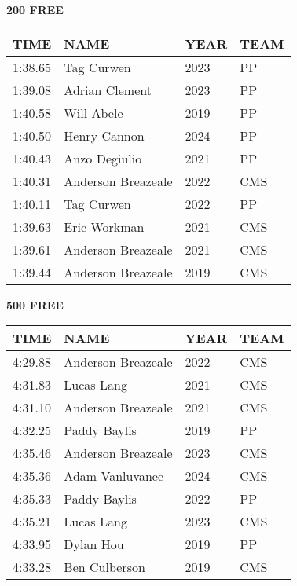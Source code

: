\begin{table}[H]
\centering
\begin{minipage}[t]{0.48\textwidth}
\centering
\textbf{200 FREE}\\[0.1cm]
\begin{tabular}{@{}p{1.8cm}p{2.8cm}p{1.2cm}p{1.4cm}@{}}
\hline
    \textbf{TIME} & \textbf{NAME} & \textbf{YEAR} & \textbf{TEAM} \\
\hline
    1:38.65 & Tag Curwen & 2023 & PP \\
    1:39.08 & Adrian Clement & 2023 & PP \\
    1:40.58 & Will Abele & 2019 & PP \\
    1:40.50 & Henry Cannon & 2024 & PP \\
    1:40.43 & Anzo Degiulio & 2021 & PP \\
    1:40.31 & Anderson Breazeale & 2022 & CMS \\
    1:40.11 & Tag Curwen & 2022 & PP \\
    1:39.63 & Eric Workman & 2021 & CMS \\
    1:39.61 & Anderson Breazeale & 2021 & CMS \\
    1:39.44 & Anderson Breazeale & 2019 & CMS \\
\hline
\end{tabular}
\end{minipage}\hfill
\begin{minipage}[t]{0.48\textwidth}
\centering
\textbf{500 FREE}\\[0.1cm]
\begin{tabular}{@{}p{1.8cm}p{2.8cm}p{1.2cm}p{1.4cm}@{}}
\hline
    \textbf{TIME} & \textbf{NAME} & \textbf{YEAR} & \textbf{TEAM} \\
\hline
    4:29.88 & Anderson Breazeale & 2022 & CMS \\
    4:31.83 & Lucas Lang & 2021 & CMS \\
    4:31.10 & Anderson Breazeale & 2021 & CMS \\
    4:32.25 & Paddy Baylis & 2019 & PP \\
    4:35.46 & Anderson Breazeale & 2023 & CMS \\
    4:35.36 & Adam Vanluvanee & 2024 & CMS \\
    4:35.33 & Paddy Baylis & 2022 & PP \\
    4:35.21 & Lucas Lang & 2023 & CMS \\
    4:33.95 & Dylan Hou & 2019 & PP \\
    4:33.28 & Ben Culberson & 2019 & CMS \\
\hline
\end{tabular}
\end{minipage}
\end{table}


